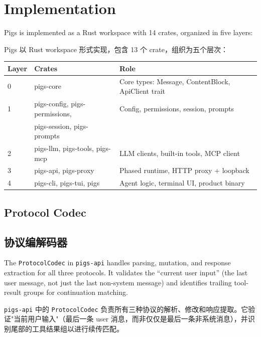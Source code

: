 \section{Implementation}
\label{sec:impl}

Pigs is implemented as a Rust workspace with 14 crates, organized in five layers:
\begin{chinese}
Pigs 以 Rust workspace 形式实现，包含 13 个 crate，组织为五个层次：
\end{chinese}

\begin{center}
\begin{tabular}{lll}
\toprule
Layer & Crates & Role \\
\midrule
0 & pigs-core & Core types: Message, ContentBlock, ApiClient trait \\
1 & pigs-config, pigs-permissions, & Config, permissions, session, prompts \\
  & pigs-session, pigs-prompts & \\
2 & pigs-llm, pigs-tools, pigs-mcp & LLM clients, built-in tools, MCP client \\
3 & pigs-api, pigs-proxy & Phased runtime, HTTP proxy + loopback \\
4 & pigs-cli, pigs-tui, pigs & Agent logic, terminal UI, product binary \\
\bottomrule
\end{tabular}
\end{center}

\subsection{Protocol Codec}
\begin{chinese}
\subsection{协议编解码器}
\end{chinese}

The \texttt{ProtocolCodec} in \texttt{pigs-api} handles parsing, mutation, and response extraction for all three protocols. It validates the ``current user input'' (the last user message, not just the last non-system message) and identifies trailing tool-result groups for continuation matching.
\begin{chinese}
\texttt{pigs-api} 中的 \texttt{ProtocolCodec} 负责所有三种协议的解析、修改和响应提取。它验证"当前用户输入"（最后一条 user 消息，而非仅仅是最后一条非系统消息），并识别尾部的工具结果组以进行续传匹配。
\end{chinese}

